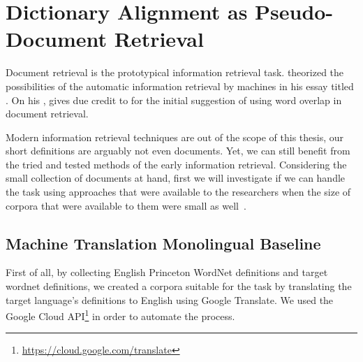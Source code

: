 
\chapter{Dictionary Alignment as Pseudo-Document Retrieval}%
\label{chap:retrieval}

Document retrieval is the prototypical information retrieval task.
\textcite{bush_as_1945} theorized the possibilities of the automatic information retrieval by machines in his essay titled .
On his , \textcite{singhal_modern_2001} gives due credit to \textcite{luhn_statistical_1957} for the initial suggestion of using word overlap in document retrieval.

Modern information retrieval techniques are out of the scope of this thesis, our short definitions are arguably not even documents.
Yet, we can still benefit from the tried and tested methods of the early information retrieval.
Considering the small collection of documents at hand, first we will investigate if we can handle the task using approaches that were available to the researchers when the size of corpora that were available to them were small as well~\cite{singhal_modern_2001}.

\section{Machine Translation Monolingual Baseline}%
\label{sec:monolingual_retrieval}

First of all, by collecting English Princeton WordNet definitions and target wordnet definitions, we created a corpora suitable for the task by translating the target language's definitions to English using Google Translate.
We used the Google Cloud API\footnote{\url{https://cloud.google.com/translate}} in order to automate the process.

